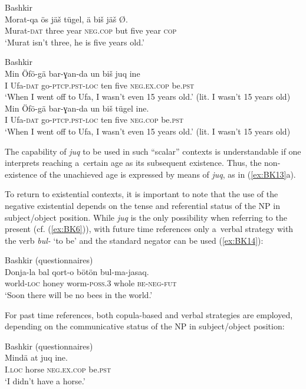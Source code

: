 \documentclass[output=paper]{langsci/langscibook}
\begin{document}
\ea Bashkir \citep[138]{mishchenko2017a} \label{ex:BK12}\\
	\gll Morat-qa	ös		jäš		tügel,			ä		biš		jäš		Ø.\\
	Murat-\textsc{dat}	three	year	\textsc{neg.cop}		but	five	year	\textsc{cop}\\
	\glt `Murat isn’t three, he is five years old.'
\z


\ea Bashkir \citep[139]{mishchenko2017a} \label{ex:BK13}\\
  \ea
	\gll Min	Öfö-gä	bar-ɣan-da		un		biš		juq			ine\\
	I		Ufa-\textsc{dat}	go-\textsc{ptcp.pst-loc}	ten	five	\textsc{neg.ex.cop}	be.\textsc{pst}\\
	\glt `When I went off to Ufa, I wasn’t even 15 years old.' (lit. I wasn’t 15 years old)
  \ex
	\gll Min	Öfö-gä	bar-ɣan-da		un		biš		tügel			ine.\\
	I		Ufa-\textsc{dat}	go-\textsc{ptcp.pst-loc}	ten	five	\textsc{neg.cop}		be.\textsc{pst}\\
	\glt `When I went off to Ufa, I wasn’t even 15 years old.' (lit. I wasn’t 15 years old)
\z \z

The capability of \textit{juq} to be used in such “scalar” contexts is understandable if one interprets reaching a certain age as its subsequent existence. Thus, the non-existence of the unachieved age is expressed by means of \textit{juq}, as in (\ref{ex:BK13}a).

To return to existential contexts, it is important to note that the use of the negative existential depends on the tense and referential status of the NP in subject/object position. While \textit{juq} is the only possibility when referring to the present (cf. (\ref{ex:BK6})), with future time references only a verbal strategy with the verb \textit{bul-} ‘to be’ and the standard negator can be used (\ref{ex:BK14}):

\ea Bashkir (questionnaires) \label{ex:BK14}\\
	\gll Donja-la		bal		qort-o		bötön		bul-ma-jasaq.\\
	world-\textsc{loc}	honey	worm-\textsc{poss.3}	whole	\textsc{be-neg-fut}\\
	\glt `Soon there will be no bees in the world.'
\z

For past time references, both copula-based and verbal strategies are employed, depending on the communicative status of the NP in subject/object position:

\ea Bashkir (questionnaires) \label{ex:BK15}\\
	\gll Mindä		at		juq				ine.\\
	I.\textsc{loc}		horse	\textsc{neg.ex.cop}		be.\textsc{pst}\\
	\glt `I didn’t have a horse.'
\z
\end{document}
